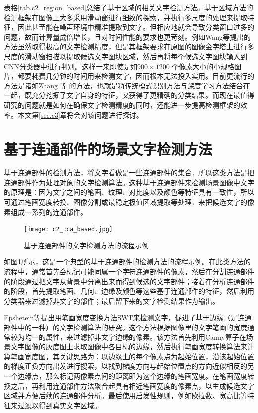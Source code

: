     表格\ref{tab.c2_region_based}总结了基于区域的相关文字检测方法。基于区域方法的检测框架在图像上大多采用滑动窗进行细致的探索，并执行多尺度的处理来提取特征，因此甚至能在噪声环境中精准提取到文字。但相应地就会导致分类窗口过多的问题，故而计算量成倍增长，且对时间性能的要求也更苛刻。例如Wang等\cite{Wang2012End}提出的方法虽然取得极高的文字检测精度，但是其框架要求在原图的图像金字塔上进行多尺度的滑动窗扫描以提取候选文字图块区域，然后再将每个候选文字图块输入到CNN分类器中进行判别。这样一来即使是如$900\times1200$ 个像素大小的小规格图片，都要耗费几分钟的时间用来检测文字，因而根本无法投入实用。目前更流行的方法是诸如Zhang 等\cite{Zhang2015Symmetry} 的方法，也就是将传统模式识别方法与深度学习方法结合在一起，既充分挖掘了文字自身的特征，又获得了更精确的分类结果。而现在最值得研究的问题就是如何在确保文字检测精度的同时，还能进一步提高检测框架的效率。本文第\ref{sec.c3}章将会对该问题进行探讨。

    \section{基于连通部件的场景文字检测方法}

    基于连通部件的检测方法，将文字看做是一些连通部件的集合，所以这类方法是把连通部件作为处理对象的文字检测算法。这种基于连通部件来检测场景图像中文字的原理是：因为文字之间的笔画、纹理、对比度以及颜色等特征具有一致性，所以可通过笔画宽度转换、图像分割或最稳定极值区域提取等处理，来把候选文字的像素组成一系列的连通部件。

    \begin{figure}[!h]
    \centering
    \texttt{[image: c2\_cca\_based.jpg]}
    \caption{基于连通部件的文字检测方法的流程示例}
    \label{fig.c2_cca_based}
    \end{figure}

    如图\ref{fig.c2_cca_based}所示，这是一个典型的基于连通部件的检测方法的流程示例。在此类方法的流程中，通常首先会标记可能同属一个字符连通部件的像素，然后在分割连通部件的阶段通过把文字从背景中分离出来而得到候选的文字部件；接着在分析连通部件的阶段，首先提取笔画、几何、边缘及颜色等这些基于连通部件的特征，然后利用分类器来过滤掉非文字的部件；最后留下来的文字检测结果作为输出。

    Epshetein等\cite{Epshtein2010Detecting}提出用笔画宽度变换方法SWT来检测文字，促进了基于边缘（是连通部件中的一种）的文字检测算法的研究。这个方法根据图像里的文字笔画的宽度通常较为均一的属性，来过滤掉非文字边缘的像素。该方法首先利用Canny算子在场景文字图像的灰度图上求取图像中各目标的边缘，然后执行笔画宽度转换算法来计算笔画宽度图，其关键思路为：以边缘上的每个像素点为起始位置，沿该起始位置的梯度正负方向出发进行搜索，以找到梯度方向与起始位置点的方向近似相反的另一个边缘点，那么标记两像素点间的距离即为这个边缘的笔画宽度。在笔画宽度转换之后，再利用连通部件方法聚合起具有相近笔画宽度的像素点，以生成候选文字区域并方便后续的连通部件分析。最后使用启发性规则，例如欧拉数、宽高比等特征来过滤以得到真实文字区域。

